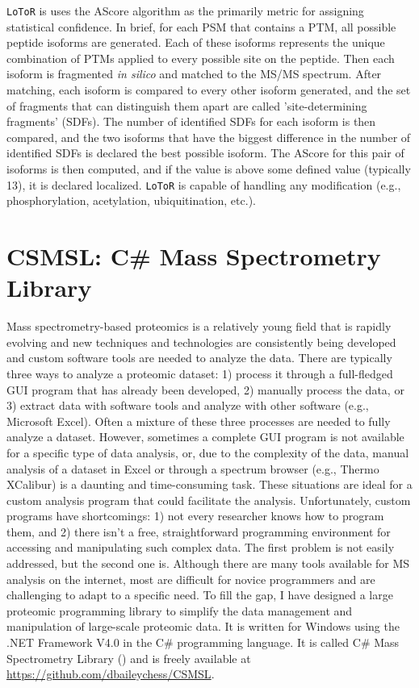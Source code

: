 \texttt{LoToR} is uses the AScore algorithm as the primarily metric for assigning statistical confidence.\cite{ascore} In brief, for each PSM that contains a PTM, all possible peptide isoforms are generated. Each of these isoforms represents the unique combination of PTMs applied to every possible site on the peptide. Then each isoform is fragmented \emph{in silico} and matched to the MS/MS spectrum. After matching, each isoform is compared to every other isoform generated, and the set of fragments that can distinguish them apart are called 'site-determining fragments' (SDFs). The number of identified SDFs for each isoform is then compared, and the two isoforms that have the biggest difference in the number of identified SDFs is declared the best possible isoform. The AScore for this pair of isoforms is then computed, and if the value is above some defined value (typically 13), it is declared localized. \texttt{LoToR} is capable of handling any modification (e.g., phosphorylation, acetylation, ubiquitination, etc.). 

\section{CSMSL: C\# Mass Spectrometry Library}
Mass spectrometry-based proteomics is a relatively young field that is rapidly evolving and new techniques and technologies are consistently being developed and custom software tools are needed to analyze the data. There are typically three ways to analyze a proteomic dataset: 1) process it through a full-fledged GUI program that has already been developed, 2) manually process the data, or 3) extract data with software tools and analyze with other software (e.g., Microsoft Excel). Often a mixture of these three processes are needed to fully analyze a dataset. However, sometimes a complete GUI program is not available for a specific type of data analysis, or, due to the complexity of the data, manual analysis of a dataset in Excel or through a spectrum browser (e.g., Thermo XCalibur) is a daunting and time-consuming task. These situations are ideal for a custom analysis program that could facilitate the analysis. Unfortunately, custom programs have shortcomings: 1) not every researcher knows how to program them, and 2) there isn't a free, straightforward programming environment for accessing and manipulating such complex data. The first problem is not easily addressed, but the second one is. Although there are many tools available for MS analysis on the internet, most are difficult for novice programmers and are challenging to adapt to a specific need. To fill the gap, I have designed a large proteomic programming library to simplify the data management and manipulation of large-scale proteomic data. It is written for Windows using the .NET Framework V4.0 in the C\# programming language. It is called C\# Mass Spectrometry Library (\csmsl{}) and is freely available at \url{https://github.com/dbaileychess/CSMSL}.

